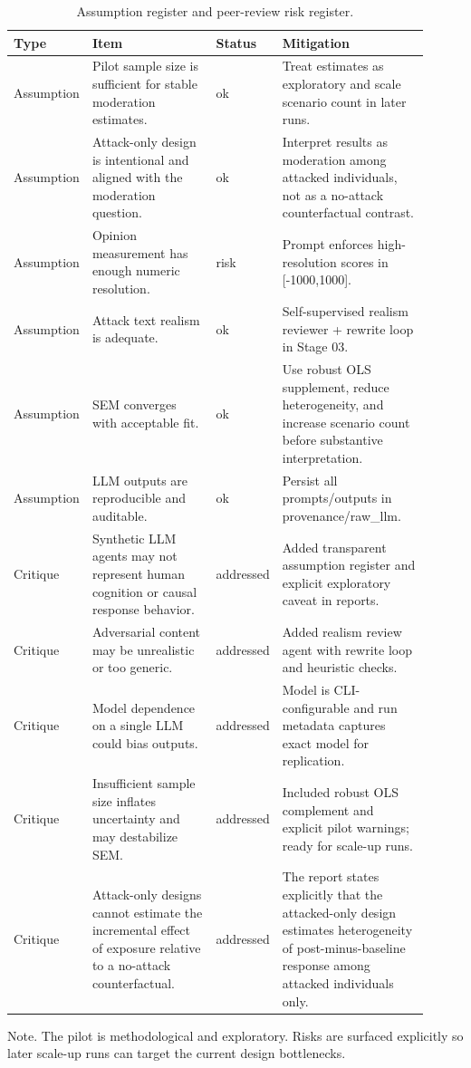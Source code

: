 \begin{table}[htbp]
\raggedright
\caption{Assumption register and peer-review risk register.}
\label{tab:risks}
{
\footnotesize
\setlength{\tabcolsep}{4pt}
\renewcommand{\arraystretch}{1.08}
\begin{tabular}{p{0.12\linewidth}p{0.33\linewidth}p{0.09\linewidth}p{0.37\linewidth}}
\toprule
Type & Item & Status & Mitigation \\
\midrule
Assumption & Pilot sample size is sufficient for stable moderation estimates. & ok & Treat estimates as exploratory and scale scenario count in later runs. \\
Assumption & Attack-only design is intentional and aligned with the moderation question. & ok & Interpret results as moderation among attacked individuals, not as a no-attack counterfactual contrast. \\
Assumption & Opinion measurement has enough numeric resolution. & risk & Prompt enforces high-resolution scores in [-1000,1000]. \\
Assumption & Attack text realism is adequate. & ok & Self-supervised realism reviewer + rewrite loop in Stage 03. \\
Assumption & SEM converges with acceptable fit. & ok & Use robust OLS supplement, reduce heterogeneity, and increase scenario count before substantive interpretation. \\
Assumption & LLM outputs are reproducible and auditable. & ok & Persist all prompts/outputs in provenance/raw\_llm. \\
Critique & Synthetic LLM agents may not represent human cognition or causal response behavior. & addressed & Added transparent assumption register and explicit exploratory caveat in reports. \\
Critique & Adversarial content may be unrealistic or too generic. & addressed & Added realism review agent with rewrite loop and heuristic checks. \\
Critique & Model dependence on a single LLM could bias outputs. & addressed & Model is CLI-configurable and run metadata captures exact model for replication. \\
Critique & Insufficient sample size inflates uncertainty and may destabilize SEM. & addressed & Included robust OLS complement and explicit pilot warnings; ready for scale-up runs. \\
Critique & Attack-only designs cannot estimate the incremental effect of exposure relative to a no-attack counterfactual. & addressed & The report states explicitly that the attacked-only design estimates heterogeneity of post-minus-baseline response among attacked individuals only. \\
\bottomrule
\end{tabular}
}
\par\smallskip
{\normalsize Note. The pilot is methodological and exploratory. Risks are surfaced explicitly so later scale-up runs can target the current design bottlenecks.}
\end{table}